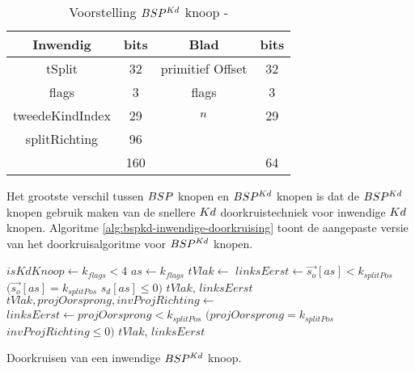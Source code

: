 \begin{table}
    \centering
    \begin{tabular}{@{}|c|c|c|c|@{}} \toprule      
        Inwendig & bits & Blad & bits \\ \midrule
        tSplit & 32 & primitief Offset & 32 \\
        flags  & 3  &  flags   & 3   \\
        tweedeKindIndex & 29 & $n$ & 29 \\
        splitRichting & 96 &  &  \\ \hline \hline
        & 160 & & 64    \\ \bottomrule
    \end{tabular}
\caption[Voorstelling $\symBSPKd$ knoop]{Voorstelling $\symBSPKd$ knoop - \small }
\label{tab:voorstelling-bspkd-knoop}
\end{table}   

Het grootste verschil tussen $BSP$ knopen en $\symBSPKd$ knopen is dat de $\symBSPKd$ knopen gebruik maken van de snellere $Kd$ doorkruistechniek voor inwendige $Kd$ knopen.
Algoritme \ref{alg:bspkd-inwendige-doorkruising} toont de aangepaste versie van het doorkruisalgoritme voor $\symBSPKd$ knopen.


\begin{dutchalgorithm}
    \begin{algorithmic}       
            \State $isKdKnoop \gets k_{flags} < 4$
                \State $as \gets k_{flags}$
                \State $tVlak \gets $ 
                \State $linksEerst \gets \vec{s_o}[as] < k_{splitPos}$ \Or $(\vec{s_o}[as] = k_{splitPos}$ \And $s_d[as] \leq 0)$
                \State \Return $tVlak$, $linksEerst$
            \Else
                \State $tVlak, projOorsprong, invProjRichting \gets $ 
                 \State $linksEerst \gets projOorsprong < k_{splitPos}$ \Or $(projOorsprong = k_{splitPos}$ \And $invProjRichting \leq 0)$
                \State \Return $tVlak$, $linksEerst$
            \EndIf
        \EndFunction
    \end{algorithmic}
    \caption{Doorkruisen van een inwendige $\symBSPKd$ knoop.}
    \label{alg:bspkd-inwendige-doorkruising}
\end{dutchalgorithm}

